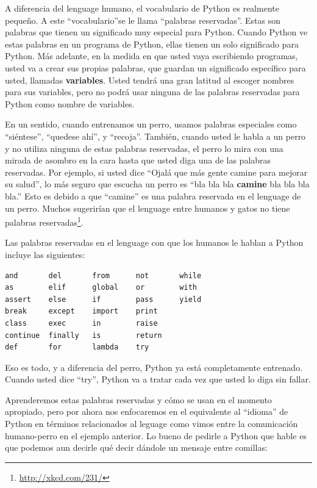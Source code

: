 A diferencia del lenguage humano, el vocabulario de Python es realmente peque\~no. A este ``vocabulario''se le llama ``palabras reservadas''. Estas son palabras que tienen un significado muy especial para Python. Cuando Python ve estas palabras en un programa de Python, ellas tienen un solo significado para Python. M\'as adelante, en la medida en que usted vaya escribiendo programas, usted va a crear sus propias palabras, que guardan un significado espec\'ifico para usted, llamadas {\bf variables}. Usted tendr\'a una gran latitud al escoger nombres para sus variables, pero no podr\'a usar ninguna de las palabras reservadas para Python como nombre de variables.

En un sentido, cuando entrenamos un perro, usamos palabras especiales como ``si\'entese'', ``quedese ah\'i'', y ``recoja''. Tambi\'en, cuando usted le habla a un perro y no utiliza ninguna de estas palabras reservadas, el perro lo mira con una mirada de asombro en la cara hasta que usted diga una de las palabras reservadas.  
Por ejemplo, si usted dice ``Ojal\'a que m\'as gente camine para mejorar su salud'', 
lo m\'as seguro que escucha un perro es ``bla bla bla {\bf camine} bla bla bla bla.''
Esto es debido a que ``camine'' es una palabra reservada en el lenguage de un perro. Muchos sugerir\'ian que el lenguage entre humanos y gatos no tiene palabras reservadas\footnote{\url{http://xkcd.com/231/}}.

Las palabras reservadas en el lenguage con que los humanos le hablan a 
Python incluye las siguientes:

\beforeverb
\begin{verbatim}
and       del       from      not       while    
as        elif      global    or        with     
assert    else      if        pass      yield    
break     except    import    print              
class     exec      in        raise              
continue  finally   is        return             
def       for       lambda    try
\end{verbatim}
\afterverb
%
Eso es todo, y a diferencia del perro, Python ya est\'a completamente entrenado.
Cuando usted dice ``try'', Python va a tratar cada vez que usted lo diga sin fallar.

Aprenderemos estas palabras reservadas y c\'omo se usan en el momento apropiado, pero por ahora nos enfocaremos en el equivalente al ``idioma'' de Python en t\'erminos relacionados al leguage como vimos entre la comunicaci\'on humano-perro en el ejemplo anterior. Lo bueno de pedirle a Python que hable es que podemos aun decirle qu\'e decir d\'andole un mensaje entre comillas:

